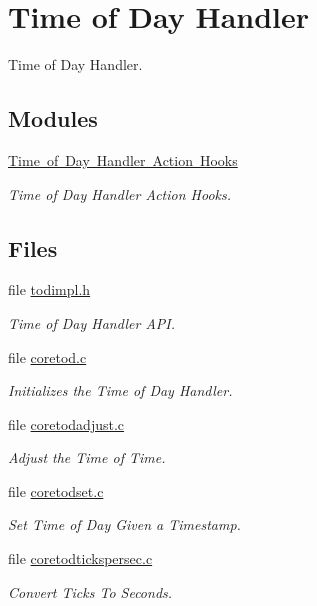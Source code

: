 \hypertarget{group__RTEMSScoreTOD}{}\section{Time of Day Handler}
\label{group__RTEMSScoreTOD}


Time of Day Handler.  


\subsection*{Modules}
\begin{DoxyCompactItemize}
\item 
\mbox{\hyperlink{group__RTEMSScoreTODHooks}{Time of Day Handler Action Hooks}}
\begin{DoxyCompactList}\small\item\em Time of Day Handler Action Hooks. \end{DoxyCompactList}\end{DoxyCompactItemize}
\subsection*{Files}
\begin{DoxyCompactItemize}
\item 
file \mbox{\hyperlink{todimpl_8h}{todimpl.\+h}}
\begin{DoxyCompactList}\small\item\em Time of Day Handler A\+PI. \end{DoxyCompactList}\item 
file \mbox{\hyperlink{coretod_8c}{coretod.\+c}}
\begin{DoxyCompactList}\small\item\em Initializes the Time of Day Handler. \end{DoxyCompactList}\item 
file \mbox{\hyperlink{coretodadjust_8c}{coretodadjust.\+c}}
\begin{DoxyCompactList}\small\item\em Adjust the Time of Time. \end{DoxyCompactList}\item 
file \mbox{\hyperlink{coretodset_8c}{coretodset.\+c}}
\begin{DoxyCompactList}\small\item\em Set Time of Day Given a Timestamp. \end{DoxyCompactList}\item 
file \mbox{\hyperlink{coretodtickspersec_8c}{coretodtickspersec.\+c}}
\begin{DoxyCompactList}\small\item\em Convert Ticks To Seconds. \end{DoxyCompactList}\end{DoxyCompactItemize}
